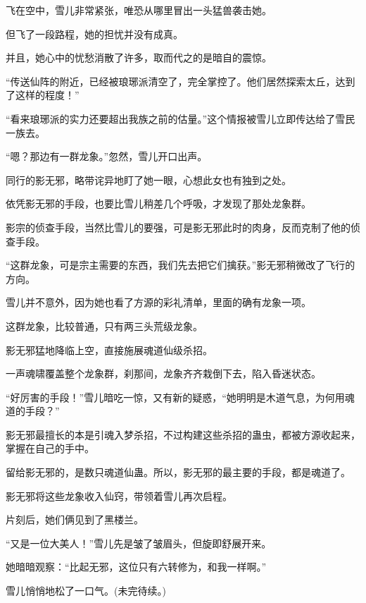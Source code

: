\begin{this_body}
飞在空中，雪儿非常紧张，唯恐从哪里冒出一头猛兽袭击她。

但飞了一段路程，她的担忧并没有成真。

并且，她心中的忧愁消散了许多，取而代之的是暗自的震惊。

“传送仙阵的附近，已经被琅琊派清空了，完全掌控了。他们居然探索太丘，达到了这样的程度！”

“看来琅琊派的实力还要超出我族之前的估量。”这个情报被雪儿立即传达给了雪民一族去。

“嗯？那边有一群龙象。”忽然，雪儿开口出声。

同行的影无邪，略带诧异地盯了她一眼，心想此女也有独到之处。

依凭影无邪的手段，也要比雪儿稍差几个呼吸，才发现了那处龙象群。

影宗的侦查手段，当然比雪儿的要强，可是影无邪此时的肉身，反而克制了他的侦查手段。

“这群龙象，可是宗主需要的东西，我们先去把它们擒获。”影无邪稍微改了飞行的方向。

雪儿并不意外，因为她也看了方源的彩礼清单，里面的确有龙象一项。

这群龙象，比较普通，只有两三头荒级龙象。

影无邪猛地降临上空，直接施展魂道仙级杀招。

一声魂啸覆盖整个龙象群，刹那间，龙象齐齐栽倒下去，陷入昏迷状态。

“好厉害的手段！”雪儿暗吃一惊，又有新的疑惑，“她明明是木道气息，为何用魂道的手段？”

影无邪最擅长的本是引魂入梦杀招，不过构建这些杀招的蛊虫，都被方源收起来，掌握在自己的手中。

留给影无邪的，是数只魂道仙蛊。所以，影无邪的最主要的手段，都是魂道了。

影无邪将这些龙象收入仙窍，带领着雪儿再次启程。

片刻后，她们俩见到了黑楼兰。

“又是一位大美人！”雪儿先是皱了皱眉头，但旋即舒展开来。

她暗暗观察：“比起无邪，这位只有六转修为，和我一样啊。”

雪儿悄悄地松了一口气。(未完待续。)

\end{this_body}

